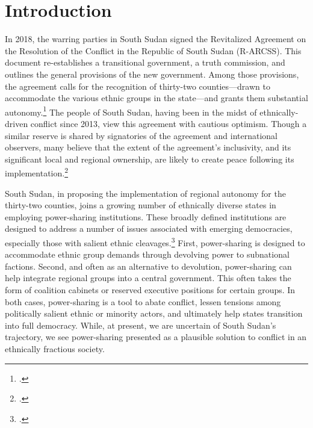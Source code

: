 \documentclass[12pt]{article}
\begin{document}


\pagebreak


\doublespacing

\section{Introduction}
In 2018, the warring parties in South Sudan signed the Revitalized Agreement on the Resolution of the Conflict in the Republic of South Sudan (R-ARCSS). This document re-establishes a transitional government, a truth commission, and outlines the general provisions of the new government. Among those provisions, the agreement calls for the recognition of thirty-two counties---drawn to accommodate the various ethnic groups in the state---and grants them substantial autonomy.\footcite{intergovernmental_authority_on_development_agreement_2015, vhumbunu_reviving_2019} The people of South Sudan, having been in the midst of ethnically-driven conflict since 2013, view this agreement with cautious optimism. Though a similar reserve is shared by signatories of the agreement and international observers, many believe that the extent of the agreement's inclusivity, and its significant local and regional ownership, are likely to create peace following its implementation.\footcite{vhumbunu_reviving_2019, njoroge_status_2019} 

South Sudan, in proposing the implementation of regional autonomy for the thirty-two counties, joins a growing number of ethnically diverse states in employing power-sharing institutions. These broadly defined institutions are designed to address a number of issues associated with emerging democracies, especially those with salient ethnic cleavages.\footcite{horowitz_ethnic_1985, lijphart_consociational_1969, esman_management_1973, nordlinger_conflict_1972} First, power-sharing is designed to accommodate ethnic group demands through devolving power to subnational factions. Second, and often as an alternative to devolution, power-sharing can help integrate regional groups into a central government. This often takes the form of coalition cabinets or reserved executive positions for certain groups. In both cases, power-sharing is a tool to abate conflict, lessen tensions among politically salient ethnic or minority actors, and ultimately help states transition into full democracy. While, at present, we are uncertain of South Sudan's trajectory, we see power-sharing presented as a plausible solution to conflict in an ethnically fractious society. 
\end{document}
